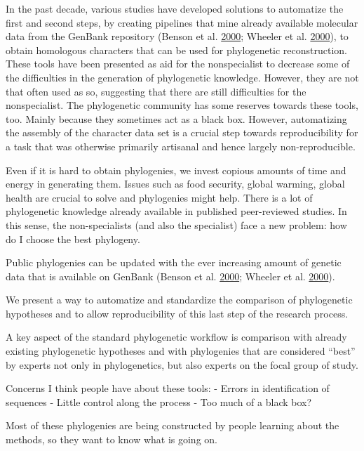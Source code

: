 \documentclass[]{article}
\begin{document}
In the past decade, various studies have developed solutions to automatize the first and second steps, by creating
pipelines that mine already available molecular data from the GenBank repository (Benson et al. \protect\hyperlink{ref-benson2000genbank}{2000}; Wheeler et al. \protect\hyperlink{ref-wheeler2000database}{2000}),
to obtain homologous characters that can be used for phylogenetic reconstruction.
These tools have been presented as aid for the nonspecialist to decrease some of
the difficulties in the generation of phylogenetic knowledge. However, they are
not that often used as so, suggesting that there are still difficulties for the nonspecialist.
The phylogenetic community has some reserves towards these tools, too. Mainly because they sometimes act as a black box.
However, automatizing the assembly of the character data set is a crucial step towards
reproducibility for a task that was otherwise primarily artisanal and hence largely
non-reproducible.

Even if it is hard to obtain phylogenies, we invest copious amounts of time and energy in generating them.
Issues such as food security, global warming, global health are crucial to solve and phylogenies might help.
There is a lot of phylogenetic knowledge already available in published peer-reviewed studies.
In this sense, the non-specialists (and also the specialist) face a new problem: how do I choose the best phylogeny.

Public phylogenies can be updated with the ever increasing amount of genetic data that is available on GenBank (Benson et al. \protect\hyperlink{ref-benson2000genbank}{2000}; Wheeler et al. \protect\hyperlink{ref-wheeler2000database}{2000}).

We present a way to automatize and standardize the comparison of phylogenetic hypotheses and to allow reproducibility of this last step of the research process.

A key aspect of the standard phylogenetic workflow is comparison with already existing
phylogenetic hypotheses and with phylogenies that are considered ``best'' by experts
not only in phylogenetics, but also experts on the focal group of study.

Concerns I think people have about these tools:
- Errors in identification of sequences
- Little control along the process
- Too much of a black box?

Most of these phylogenies are being constructed by people learning about the methods,
so they want to know what is going on.
\end{document}
